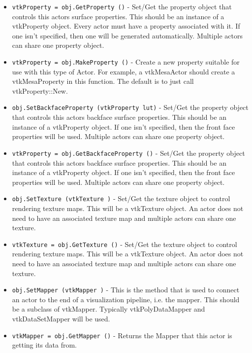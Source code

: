 \begin{itemize}
\item  \verb|vtkProperty = obj.GetProperty ()| -  Set/Get the property object that controls this actors surface
 properties.  This should be an instance of a vtkProperty object.  Every
 actor must have a property associated with it.  If one isn't specified,
 then one will be generated automatically. Multiple actors can share one
 property object.

\item  \verb|vtkProperty = obj.MakeProperty ()| -  Create a new property suitable for use with this type of Actor.
 For example, a vtkMesaActor should create a vtkMesaProperty 
 in this function.   The default is to just call vtkProperty::New.

\item  \verb|obj.SetBackfaceProperty (vtkProperty lut)| -  Set/Get the property object that controls this actors backface surface
 properties.  This should be an instance of a vtkProperty object. If one
 isn't specified, then the front face properties will be used.  Multiple
 actors can share one property object.

\item  \verb|vtkProperty = obj.GetBackfaceProperty ()| -  Set/Get the property object that controls this actors backface surface
 properties.  This should be an instance of a vtkProperty object. If one
 isn't specified, then the front face properties will be used.  Multiple
 actors can share one property object.

\item  \verb|obj.SetTexture (vtkTexture )| -  Set/Get the texture object to control rendering texture maps.  This will
 be a vtkTexture object. An actor does not need to have an associated
 texture map and multiple actors can share one texture.

\item  \verb|vtkTexture = obj.GetTexture ()| -  Set/Get the texture object to control rendering texture maps.  This will
 be a vtkTexture object. An actor does not need to have an associated
 texture map and multiple actors can share one texture.

\item  \verb|obj.SetMapper (vtkMapper )| -  This is the method that is used to connect an actor to the end of a
 visualization pipeline, i.e. the mapper. This should be a subclass
 of vtkMapper. Typically vtkPolyDataMapper and vtkDataSetMapper will
 be used.

\item  \verb|vtkMapper = obj.GetMapper ()| -  Returns the Mapper that this actor is getting its data from.


\end{itemize}
